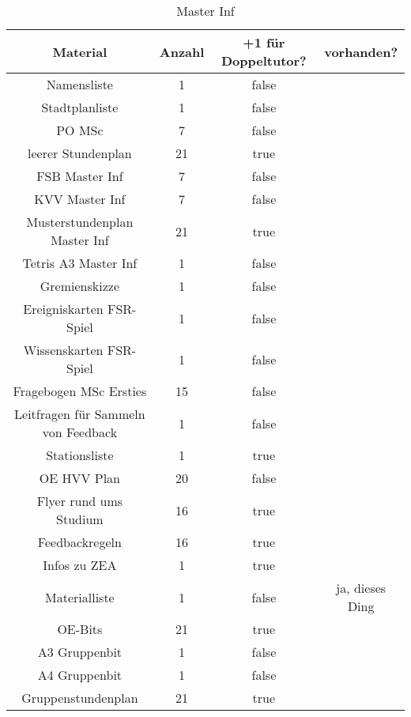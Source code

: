 \documentclass[10pt,a4paper,oneside,ngerman,numbers=noenddot]{scrartcl}
\begin{document}
\begin{table}[ht]
	\caption{Master Inf}
	\begin{tabular}{c|c|c|c}
		\textbf{Material} & \textbf{Anzahl} & \textbf{+1 für Doppeltutor?} & \textbf{vorhanden?} \\
		\hline
		Namensliste & 1 & false & \\
		\hline
		Stadtplanliste & 1 & false & \\
		\hline
		PO MSc & 7 & false & \\
		\hline
		leerer Stundenplan & 21 & true & \\
		\hline
		FSB Master Inf & 7 & false & \\
		\hline
		KVV Master Inf & 7 & false & \\
		\hline
		Musterstundenplan Master Inf & 21 & true & \\
		\hline
		Tetris A3 Master Inf & 1 & false & \\
		\hline
		Gremienskizze & 1 & false & \\
		\hline
		Ereigniskarten FSR-Spiel & 1 & false & \\
		\hline
		Wissenskarten FSR-Spiel & 1 & false & \\
		\hline
		Fragebogen MSc Ersties & 15 & false & \\
		\hline
		Leitfragen für Sammeln von Feedback & 1 & false & \\
		\hline
		Stationsliste & 1 & true & \\
		\hline
		OE HVV Plan & 20 & false & \\
		\hline
		Flyer rund ums Studium & 16 & true & \\
		\hline
		Feedbackregeln & 16 & true & \\
		\hline
		Infos zu ZEA & 1 & true & \\
		\hline
		Materialliste & 1 & false & ja, dieses Ding \\
		\hline
		OE-Bits & 21 & true & \\
		\hline
		A3 Gruppenbit & 1 & false & \\
		\hline
		A4 Gruppenbit & 1 & false & \\
		\hline
		Gruppenstundenplan & 21 & true &
	\end{tabular}
\end{table}
\end{document}
